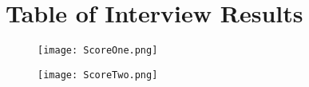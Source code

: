 
\pagebreak
\section{Table of Interview Results}



\begin{figure}[h]
    \centering
    \texttt{[image: ScoreOne.png]}
\end{figure}

\begin{figure}[h]
    \centering
    \texttt{[image: ScoreTwo.png]}
\end{figure}
